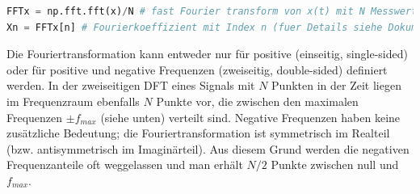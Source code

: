 \begin{lstlisting}[language = Python]
FFTx = np.fft.fft(x)/N # fast Fourier transform von x(t) mit N Messwerten
Xn = FFTx[n] # Fourierkoeffizient mit Index n (fuer Details siehe Dokumentation)
\end{lstlisting}

Die Fouriertransformation kann entweder nur für positive (einseitig, single-sided) oder für positive und negative Frequenzen (zweiseitig, double-sided) definiert werden. In der zweiseitigen DFT eines Signals mit $N$ Punkten in der Zeit liegen im Frequenzraum ebenfalls $N$ Punkte vor, die zwischen den maximalen Frequenzen $\pm f_{max}$ (siehe unten) verteilt sind. Negative Frequenzen haben keine zusätzliche Bedeutung; die Fouriertransformation ist symmetrisch im Realteil (bzw. antisymmetrisch im Imaginärteil). Aus diesem Grund werden die negativen Frequenzanteile oft weggelassen und man erhält $N/2$ Punkte zwischen null und $f_{max}$.

